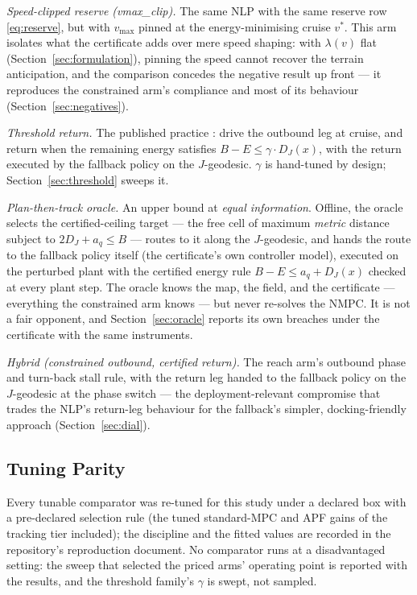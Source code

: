 \documentclass[preprint,12pt]{elsarticle}
\begin{document}
\emph{Speed-clipped reserve (vmax\_clip).} The same NLP with the same
reserve row \eqref{eq:reserve}, but with $v_{\max}$ pinned at the
energy-minimising cruise $v^{*}$. This arm isolates what the
certificate adds over mere speed shaping: with $\lambda(v)$ flat
(Section~\ref{sec:formulation}), pinning the speed cannot recover the
terrain anticipation, and the comparison concedes the negative result
up front --- it reproduces the constrained arm's compliance and most
of its behaviour (Section~\ref{sec:negatives}).

\emph{Threshold return.} The published practice
\cite{huang2015adaptive, li2026robust}: drive the outbound leg at
cruise, and return when the remaining energy satisfies
$B - E \le \gamma \cdot D_J(x)$, with the return executed by the
fallback policy on the $J$-geodesic. $\gamma$ is hand-tuned by
design; Section~\ref{sec:threshold} sweeps it.

\emph{Plan-then-track oracle.} An upper bound at \emph{equal
information}. Offline, the oracle selects the certified-ceiling
target --- the free cell of maximum \emph{metric} distance subject
to $2 D_J + a_q \le B$ --- routes to it along the $J$-geodesic, and
hands the route to the fallback policy itself (the certificate's own
controller model), executed on the perturbed plant with the
certified energy rule $B - E \le a_q + D_J(x)$ checked at every
plant step.
The oracle knows
the map, the field, and the certificate --- everything the constrained
arm knows --- but never re-solves the NMPC. It is not a fair
opponent, and Section~\ref{sec:oracle} reports its own breaches
under the certificate with the same instruments.

\emph{Hybrid (constrained outbound, certified return).} The reach arm's
outbound phase and turn-back stall rule, with the return leg handed
to the fallback policy on the $J$-geodesic at the phase switch ---
the deployment-relevant compromise that trades the NLP's return-leg
behaviour for the fallback's simpler, docking-friendly approach
(Section~\ref{sec:dial}).

\subsection{Tuning Parity}
Every tunable comparator was re-tuned for this study under a declared
box with a pre-declared selection rule (the tuned standard-MPC and
APF gains of the tracking tier included); the discipline and the
fitted values are recorded in the repository's reproduction document.
No comparator runs at a disadvantaged setting: the sweep that selected
the priced arms' operating point is reported with the results, and
the threshold family's $\gamma$ is swept, not sampled.
\end{document}
